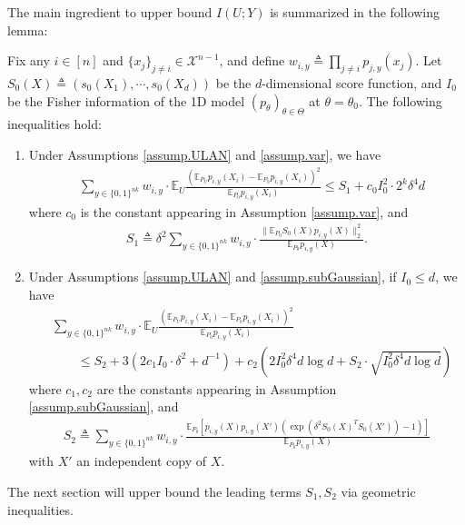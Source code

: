 \documentclass[final,12pt]{colt2018} %
\def \bE {\mathbb{E}}
\newcommand{\calX}{{\mathcal{X}}}
\begin{document}
The main ingredient to upper bound $I(U;Y)$ is summarized in the following lemma: 
\begin{lemma}\label{lemma.upper_bound}
	Fix any $i\in [n]$ and $\{x_j\}_{j\neq i}\in \calX^{n-1}$, and define $w_{i,y}\triangleq \prod_{j\neq i} p_{j,y}(x_j)$. Let $S_0(X)\triangleq(s_0(X_1),\cdots,s_0(X_d))$ be the $d$-dimensional score function, and $I_0$ be the Fisher information of the 1D model $(p_\theta)_{\theta\in\Theta}$ at $\theta=\theta_0$. The following inequalities hold: 
	\begin{enumerate}
		\item Under Assumptions \ref{assump.ULAN} and \ref{assump.var}, we have
		\begin{align*}
		&\sum_{y\in \{0,1\}^{nk}}w_{i,y}\cdot \bE_U \frac{( \mathbb{E}_{P_U}p_{i,y}(X_i) - \mathbb{E}_{P_0}p_{i,y}(X_i) )^2 }{\mathbb{E}_{P_0}p_{i,y}(X_i)} \le S_1 + c_0I_0^2\cdot 2^k\delta^4d
		\end{align*}
		where $c_0$ is the constant appearing in Assumption \ref{assump.var}, and
		\begin{align*}
		S_1 \triangleq \delta^2\sum_{y\in \{0,1\}^{nk}}w_{i,y}\cdot \frac{\|\bE_{P_0} S_0(X)p_{i,y}(X)\|_2^2}{\bE_{P_0} p_{i,y}(X)}. 
		\end{align*} 
		\item Under Assumptions \ref{assump.ULAN} and \ref{assump.subGaussian}, if $I_0\le d$, we have
		\begin{align*}
		&\sum_{y\in \{0,1\}^{nk}}w_{i,y}\cdot \bE_U \frac{( \mathbb{E}_{P_U}p_{i,y}(X_i) - \mathbb{E}_{P_0}p_{i,y}(X_i) )^2 }{\mathbb{E}_{P_0}p_{i,y}(X_i)} \\
		&\qquad \le S_2 + 3(2c_1I_0\cdot \delta^2+d^{-1}) + c_2 (2I_0^2\delta^4d\log d+S_2\cdot\sqrt{I_0^2\delta^4d\log d})
		\end{align*}
		where $c_1,c_2$ are the constants appearing in Assumption \ref{assump.subGaussian}, and
		\begin{align*}
		S_2 \triangleq \sum_{y\in \{0,1\}^{nk}}w_{i,y}\cdot \frac{\bE_{P_0}[p_{i,y}(X)p_{i,y}(X')(\exp(\delta^2S_0(X)^TS_0(X')) -1) ]}{\bE_{P_0} p_{i,y}(X)}
		\end{align*}
		with $X'$ an independent copy of $X$. 
	\end{enumerate}
\end{lemma}
The next section will upper bound the leading terms $S_1, S_2$ via geometric inequalities. 
\end{document}
